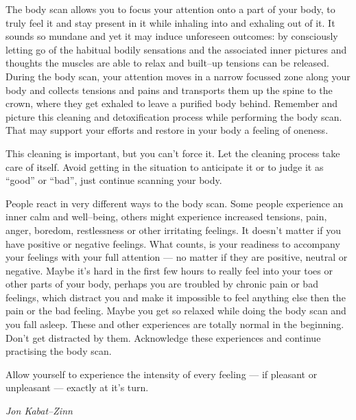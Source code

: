\documentclass[../main.tex]{subfiles}
\begin{document}
The body scan allows you to {focus your attention} onto a part of your body, to truly feel it and {stay present} in it while {inhaling into and exhaling out of it}. 
It sounds so mundane and yet it may induce {unforeseen outcomes}:
by consciously letting go of the habitual bodily sensations and the associated inner pictures and thoughts
the muscles are able to {relax} and built--up tensions can be released.
During the body scan, your {attention moves in a narrow focussed zone} along your body and {collects tensions and pains} and transports them up the spine to the crown,
where they {get exhaled} to leave a {purified body} behind.
Remember and picture this cleaning and detoxification process while performing the body scan.
That may support your efforts and restore in your body a feeling of oneness.

This {cleaning} is important, but you can't force it.
Let the cleaning process {take care of itself}.
Avoid getting in the situation to anticipate it or to judge it as ``good'' or ``bad'', just continue scanning your body.

People react in very different ways to the body scan.
Some people experience an {inner calm and well--being},
others might experience {increased tensions, pain, anger, boredom, restlessness} or other irritating feelings. 
It doesn't matter if you have positive or negative feelings.
What counts, is {your readiness to accompany your feelings with your full attention} --- no matter if they are positive, neutral or negative.
Maybe it's hard in the first few hours to {really feel into your toes} or other parts of your body,
perhaps you are troubled by {chronic pain or bad feelings}, which distract you and make it {impossible to feel anything else} then the pain or the bad feeling.
Maybe you get so {relaxed} while doing the body scan and you {fall asleep}.
These and other experiences are {totally normal in the beginning}.
Don't get distracted by them.
Acknowledge these experiences and {continue practising the body scan}.

\epigraph{Allow yourself to experience the intensity of every feeling --- if pleasant or unpleasant ---  exactly at it's turn. }{\textit{Jon Kabat--Zinn}}
\end{document}
